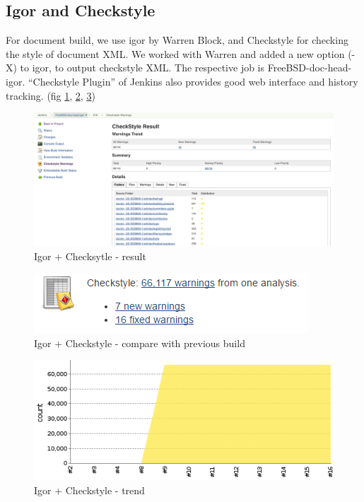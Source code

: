 \documentclass[a4paper,twocolumn,10pt]{article}
\begin{document}
\subsection{Igor and Checkstyle}

For document build, we use igor \cite{igor} by Warren Block, and Checkstyle
\cite{checkstyle} for checking the style of document XML. We worked with Warren
and added a new option (-X) to igor, to output checkstyle XML. The respective
job is FreeBSD-doc-head-igor.  ``Checkstyle Plugin'' of Jenkins also provides
good web interface and history tracking. (fig \ref{checkstyle-result},
\ref{checkstyle-compare}, \ref{checkstyle-trend})

\begin{figure}
\includegraphics[width=\textwidth]{checkstyle-result.png}
\caption{Igor + Checksytle - result}
\label{checkstyle-result}
\end{figure}

\begin{figure}
\includegraphics{checkstyle-compare.png}
\caption{Igor + Checkstyle - compare with previous build}
\label{checkstyle-compare}
\end{figure}

\begin{figure}
\includegraphics{checkstyle-trend.png}
\caption{Igor + Checkstyle - trend}
\label{checkstyle-trend}
\end{figure}
\end{document}
